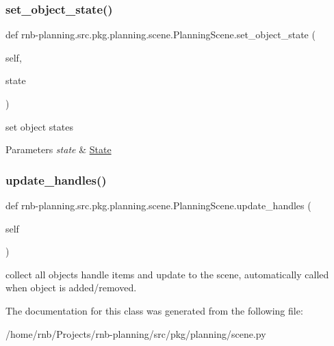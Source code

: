 \subsubsection{\texorpdfstring{set\+\_\+object\+\_\+state()}{set\_object\_state()}}
{\footnotesize\ttfamily def rnb-\/planning.\+src.\+pkg.\+planning.\+scene.\+Planning\+Scene.\+set\+\_\+object\+\_\+state (\begin{DoxyParamCaption}\item[{}]{self,  }\item[{}]{state }\end{DoxyParamCaption})}



set object states 


\begin{DoxyParams}{Parameters}
{\em state} & \hyperlink{classrnb-planning_1_1src_1_1pkg_1_1planning_1_1scene_1_1_state}{State} \\
\hline
\end{DoxyParams}
\mbox{\label{classrnb-planning_1_1src_1_1pkg_1_1planning_1_1scene_1_1_planning_scene_aa87ad00baefece92548c6c8b6e720741}} 
\subsubsection{\texorpdfstring{update\+\_\+handles()}{update\_handles()}}
{\footnotesize\ttfamily def rnb-\/planning.\+src.\+pkg.\+planning.\+scene.\+Planning\+Scene.\+update\+\_\+handles (\begin{DoxyParamCaption}\item[{}]{self }\end{DoxyParamCaption})}



collect all objects\textquotesingle{} handle items and update to the scene, automatically called when object is added/removed. 



The documentation for this class was generated from the following file\+:\begin{DoxyCompactItemize}
\item 
/home/rnb/\+Projects/rnb-\/planning/src/pkg/planning/scene.\+py\end{DoxyCompactItemize}
